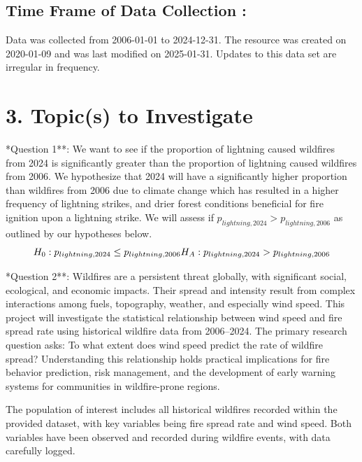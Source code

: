 \documentclass[
]{article}
\begin{document}
\subsection{Time Frame of Data Collection
:}\label{time-frame-of-data-collection}

\indent Data was collected from 2006-01-01 to 2024-12-31. The resource
was created on 2020-01-09 and was last modified on 2025-01-31. Updates
to this data set are irregular in frequency.

\section{3. Topic(s) to Investigate}\label{topics-to-investigate}

\indent **Question 1**: We want to see if the proportion of lightning
caused wildfires from 2024 is significantly greater than the proportion
of lightning caused wildfires from 2006. We hypothesize that 2024 will
have a significantly higher proportion than wildfires from 2006 due to
climate change which has resulted in a higher frequency of lightning
strikes, and drier forest conditions beneficial for fire ignition upon a
lightning strike. We will assess if
\(p_{lightning, 2024} > p_{lightning, 2006}\) as outlined by our
hypotheses below. \[
H_{0} :         p_{lightning, 2024} \leq p_{lightning, 2006} \\
H_{A}:  p_{lightning, 2024}  > p_{lightning, 2006}
\]

\indent **Question 2**: Wildfires are a persistent threat globally, with
significant social, ecological, and economic impacts. Their spread and
intensity result from complex interactions among fuels, topography,
weather, and especially wind speed. This project will investigate the
statistical relationship between wind speed and fire spread rate using
historical wildfire data from 2006--2024. The primary research question
asks: To what extent does wind speed predict the rate of wildfire
spread? Understanding this relationship holds practical implications for
fire behavior prediction, risk management, and the development of early
warning systems for communities in wildfire-prone regions.

The population of interest includes all historical wildfires recorded
within the provided dataset, with key variables being fire spread rate
and wind speed. Both variables have been observed and recorded during
wildfire events, with data carefully logged.
\end{document}

